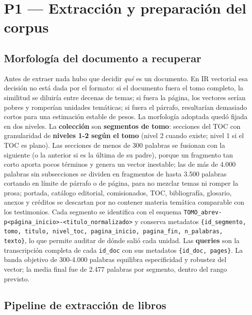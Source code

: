 \documentclass[11pt]{tg_usta}
\begin{document}
\section{P1 --- Extracción y preparación del corpus}\label{sec:p1}

\subsection{Morfología del documento a recuperar}

Antes de extraer nada hubo que decidir \textit{qué} es un documento. En IR vectorial esa decisión no está dada por el formato: si el documento fuera el tomo completo, la similitud se diluiría entre decenas de temas; si fuera la página, los vectores serían pobres y romperían unidades temáticas; si fuera el párrafo, resultarían demasiado cortos para una estimación estable de pesos. La morfología adoptada quedó fijada en dos niveles. La \textbf{colección} son \textbf{segmentos de tomo}: secciones del TOC con granularidad de \textbf{niveles 1-2 según el tomo} (nivel 2 cuando existe; nivel 1 si el TOC es plano). Las secciones de menos de 300 palabras se fusionan con la siguiente (o la anterior si es la última de su padre), porque un fragmento tan corto aporta pocos términos y genera un vector inestable; las de más de 4.000 palabras sin subsecciones se dividen en fragmentos de hasta 3.500 palabras cortando en límite de párrafo o de página, para no mezclar temas ni romper la prosa; portada, catálogo editorial, comisionados, TOC, bibliografía, glosario, anexos y créditos se descartan por no contener materia temática comparable con los testimonios. Cada segmento se identifica con el esquema \texttt{TOMO\_abrev-p<página\_inicio>-<titulo\_normalizado>} y conserva metadatos \texttt{\{id\_segmento, tomo, titulo, nivel\_toc, pagina\_inicio, pagina\_fin, n\_palabras, texto\}}, lo que permite auditar de dónde salió cada unidad. Las \textbf{queries} son la transcripción completa de cada \texttt{id\_doc} con sus metadatos \texttt{\{id\_doc, pages\}}. La banda objetivo de 300-4.000 palabras equilibra especificidad y robustez del vector; la media final fue de 2.477 palabras por segmento, dentro del rango previsto.

\subsection{Pipeline de extracción de libros}
\end{document}
